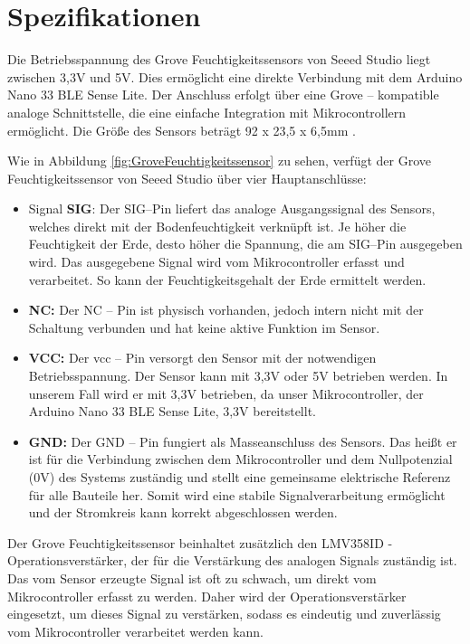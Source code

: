 	\section{Spezifikationen}
		Die Betriebsspannung des Grove Feuchtigkeitssensors von Seeed Studio liegt zwischen 3,3V und 5V. Dies ermöglicht eine direkte Verbindung mit dem Arduino Nano 33 BLE Sense Lite. Der Anschluss erfolgt über eine Grove – kompatible analoge Schnittstelle, die eine einfache Integration mit Mikrocontrollern ermöglicht. Die Größe des Sensors beträgt 92 x 23,5 x 6,5mm \cite{Seeed_Datasheet:2019}.

		\vspace{1\baselineskip}

		Wie in Abbildung \ref{fig:GroveFeuchtigkeitssensor} zu sehen, verfügt der Grove Feuchtigkeitssensor von Seeed Studio über vier Hauptanschlüsse:
		\cite{Huang:2023}
		
		\begin{itemize}
			\item Signal \textbf{SIG}: Der SIG–Pin liefert das analoge Ausgangssignal des Sensors, welches direkt mit der Bodenfeuchtigkeit verknüpft ist. Je höher die Feuchtigkeit der Erde, desto höher die Spannung, die am SIG–Pin ausgegeben wird. Das ausgegebene Signal wird vom Mikrocontroller erfasst und verarbeitet. So kann der Feuchtigkeitsgehalt der Erde ermittelt werden.
			 
			\item \textbf{NC:} Der NC – Pin ist physisch vorhanden, jedoch intern nicht mit der Schaltung verbunden und hat keine aktive Funktion im Sensor.  
			
			\item \textbf{VCC:} Der \ac{vcc} – Pin versorgt den Sensor mit der notwendigen Betriebsspannung. Der Sensor kann mit 3,3V oder 5V betrieben werden. In unserem Fall wird er mit 3,3V betrieben, da unser Mikrocontroller, der Arduino Nano 33 BLE Sense Lite, 3,3V bereitstellt. 
			
			\item \textbf{GND:} Der GND – Pin fungiert als Masseanschluss des Sensors. Das heißt er ist für die Verbindung zwischen dem Mikrocontroller und dem Nullpotenzial (0V) des Systems zuständig und stellt eine gemeinsame elektrische Referenz für alle Bauteile her. Somit wird eine stabile Signalverarbeitung ermöglicht und der Stromkreis kann korrekt abgeschlossen werden.
		\end{itemize}
		
		Der Grove Feuchtigkeitssensor beinhaltet zusätzlich den LMV358ID - Operationsverstärker, der für die Verstärkung des analogen Signals zuständig ist. Das vom Sensor erzeugte Signal ist oft zu schwach, um direkt vom Mikrocontroller erfasst zu werden. Daher wird der Operationsverstärker eingesetzt, um dieses Signal zu verstärken, sodass es eindeutig und zuverlässig vom Mikrocontroller verarbeitet werden kann. \cite{Texas:2023a}


